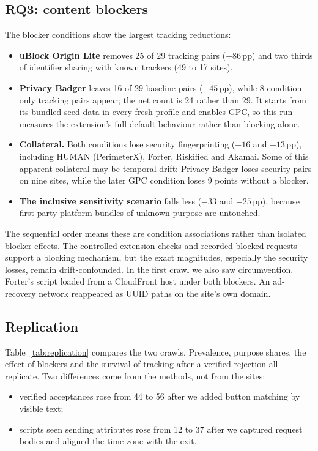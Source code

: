 \documentclass[sigconf,review,anonymous]{acmart}
\newcommand{\pp}{\,pp}
\begin{document}
\subsection{RQ3: content blockers}
The blocker conditions show the largest tracking reductions:
\begin{itemize}
\item \textbf{uBlock Origin Lite} removes 25 of 29 tracking pairs ($-86$\pp{}) and two thirds of
  identifier sharing with known trackers (49 to 17 sites).
\item \textbf{Privacy Badger} leaves 16 of 29 baseline pairs ($-45$\pp{}), while 8
  condition-only tracking pairs appear; the net count is 24 rather than 29. It starts from its
  bundled seed data in every fresh profile and enables GPC, so this run measures the extension's
  full default behaviour rather than blocking alone.
\item \textbf{Collateral.} Both conditions lose security fingerprinting ($-16$ and $-13$\pp{}),
  including HUMAN (PerimeterX), Forter, Riskified and Akamai. Some of this apparent collateral
  may be temporal drift: Privacy Badger loses security pairs on nine sites, while the later GPC
  condition loses 9 points without a blocker.
\item \textbf{The inclusive sensitivity scenario} falls less ($-33$ and $-25$\pp{}), because first-party platform
  bundles of unknown purpose are untouched.
\end{itemize}
The sequential order means these are condition associations rather than isolated blocker effects.
The controlled extension checks and recorded blocked requests support a blocking mechanism, but
the exact magnitudes, especially the security losses, remain drift-confounded.
In the first crawl we also saw circumvention. Forter's script loaded from a CloudFront host
under both blockers. An ad-recovery network reappeared as UUID paths on the site's own domain.

\subsection{Replication}\label{sec:replication}
Table~\ref{tab:replication} compares the two crawls. Prevalence, purpose shares, the effect of
blockers and the survival of tracking after a verified rejection all replicate. Two differences
come from the methods, not from the sites:
\begin{itemize}
\item verified acceptances rose from 44 to 56 after we added button matching by visible text;
\item scripts seen sending attributes rose from 12 to 37 after we captured request bodies and
  aligned the time zone with the exit.
\end{itemize}
\end{document}

